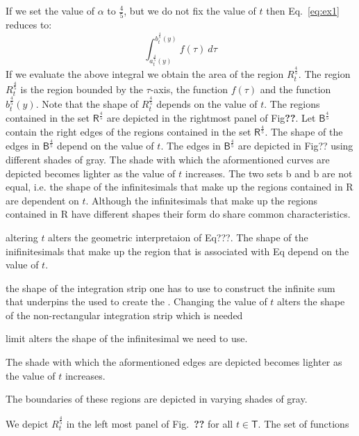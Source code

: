 \documentclass{article}
\theoremstyle{theorem}
\theoremstyle{definition}
\begin{document}
If we set the value of $\alpha$ to $\frac{4}{5}$, but we do not fix the value of $t$ then Eq.~\eqref{eq:ex1} reduces to:
\begin{equation}
\int_{a_{t}^{\frac{4}{5}}(y)}^{b_{t}^{\frac{4}{5}}(y)} f(\tau)~d\tau 
\end{equation}
If we evaluate the above integral we obtain the area of the region $R_{t}^{\frac{4}{5}}$. The region $R_{t}^{\frac{4}{5}}$ is the region bounded by the $\tau$-axis, the function $f(\tau)$ and the function $b_{t}^{\frac{4}{5}}(y)$.
Note that the shape of $R_{t}^{\frac{4}{5}}$ depends on the value of $t$. The regions contained in the set $\mathsf{R}^{\frac{4}{5}}$ are depicted in the rightmost panel of Fig\textbf{??}. Let $\mathsf{B}^{\frac{4}{5}}$ contain the right 
edges of the regions contained in the set $\mathsf{R}^{\frac{4}{5}}$. The shape of the edges in $\mathsf{B}^{\frac{4}{5}}$ depend on the value of $t$. The edges in $\mathsf{B}^{\frac{4}{5}}$ are depicted in Fig?? using different shades of gray. The shade with which the aformentioned curves are depicted becomes lighter 
as the value of $t$ increases. The two sets b and b are not equal, i.e. the shape of the infinitesimals that make up the regions contained in 
R are dependent on $t$. Although the infinitesimals that make up the regions contained in R have different shapes their form do share common characteristics. 







altering $t$ alters the geometric interpretaion of 
Eq???. The shape of the inifinitesimals that make up the region that is associated with Eq depend on the value of $t$. 


the shape of the integration strip one has to use to construct the infinite sum that underpins the  used to create the   . Changing the value of $t$ alters the shape of the non-rectangular integration strip which is needed 


limit alters the
shape of the infinitesimal we need to use.


The shade with which the aformentioned edges are depicted becomes lighter as the value of $t$ increases.



The boundaries of these regions are depicted in varying shades of gray.  


We depict $R_{t}^{\frac{4}{5}}$ in the left most panel of Fig.~\textbf{??} for all $t\in\mathsf{T}$. The set of functions   
\end{document}
